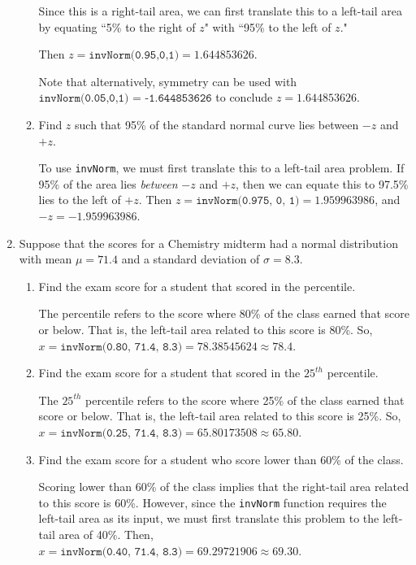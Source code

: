 \documentclass{article}
\newcommand{\answer}[1]{\color{white}#1}
\begin{document}
\begin{enumerate}
\begin{enumerate}
	{\answer Since this is a right-tail area, we can first translate this to a left-tail area by equating ``5\% to the right of $z$" with ``95\% to the left of $z$."  
	
	Then $z = \texttt{invNorm(0.95,0,1)} = 1.644853626$. 
	
	Note that alternatively, symmetry can be used with  $\texttt{invNorm(0.05,0,1) = -1.644853626}$ to conclude $z=1.644853626$.
	} 

	\item Find $z$ such that 95\% of the standard normal curve lies between $-z$ and $+z$. 
	
	{\answer To use \texttt{invNorm}, we must first translate this to a left-tail area problem.  If 95\% of the area lies {\em between} $-z$ and $+z$, then we can equate this to 97.5\% lies to the left of $+z$.  
	Then $z = \texttt{invNorm(0.975, 0, 1)} = 1.959963986$, and $-z = -1.959963986$.
	} 
	
	\end{enumerate}
	
\item Suppose that the scores for a Chemistry midterm had a normal distribution with mean $\mu = 71.4$ and a standard deviation of $\sigma = 8.3$.

	\begin{enumerate}
	
	\item Find the exam score for a student that scored in the  percentile. 
	
	{\answer The  percentile refers to the score where 80\% of the class earned that score or below.  That is, the left-tail area related to this score is 80\%. So, $x = \texttt{invNorm(0.80, 71.4, 8.3)} = 78.38545624 \approx 78.4$.
	} 
	
	\item Find the exam score for a student that scored in the $25^{th}$ percentile. 
	
	{\answer The $25^{th}$ percentile refers to the score where 25\% of the class earned that score or below.  That is, the left-tail area related to this score is 25\%. So, $x = \texttt{invNorm(0.25, 71.4, 8.3)} = 65.80173508 \approx 65.80$.
	} 
	
	\item Find the exam score for a student who score lower than 60\% of the class. 
	
	{\answer Scoring lower than 60\% of the class implies that the right-tail area related to this score is 60\%.  However, since the \texttt{invNorm} function requires the left-tail area as its input, we must first translate this problem to the left-tail area of 40\%.	Then,  $x = \texttt{invNorm(0.40, 71.4, 8.3)} = 69.29721906 \approx 69.30$.
	} 
	\end{enumerate}


\end{enumerate}
\end{document}
